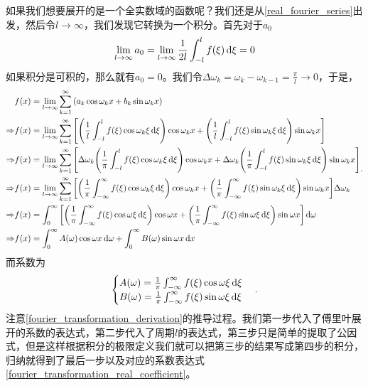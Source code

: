 \documentclass[12pt,a4paper,openany,twoside]{book}
\numberwithin{equation}{section}
\begin{document}
        如果我们想要展开的是一个全实数域的函数呢？我们还是从\ref{real_fourier_series}出发，然后令$l\to\infty$，我们发现它转换为一个积分。首先对于$a_0$
        \begin{equation}
          \lim_{l\to\infty}{a_0}=\lim_{l\to\infty}{\frac{1}{2l}\int_{-l}^{l}{f\qty(\xi)\dd{\xi}}}=0
        \end{equation}
        如果积分是可积的，那么就有$a_0=0$。我们令$\Delta\omega_k=\omega_k-\omega_{k-1}=\frac{\pi}{l}\to0$，于是，
        \begin{equation}
          \label{fourier_transformation_derivation}
          \begin{aligned}
            &f\qty(x)=\lim_{l\to\infty}\sum_{k=1}^{\infty}{\qty(a_k\cos{\omega_k x}+b_k\sin{\omega_k x})}\\
            \Rightarrow&f\qty(x)=\lim_{l\to\infty}{\sum_{k=1}^{\infty}{\qty[\qty(\frac{1}{l}\int_{-l}^l{f\qty(\xi)\cos{\omega_k\xi}\dd{\xi}})\cos{\omega_k x}+\qty(\frac{1}{l}\int_{-l}^l{f\qty(\xi)\sin{\omega_k\xi}\dd{\xi}})\sin{\omega_k x}]}}\\
            \Rightarrow&f\qty(x)=\lim_{l\to\infty}{\sum_{k=1}^{\infty}{\qty[\Delta\omega_k\qty(\frac{1}{\pi}\int_{-l}^l{f\qty(\xi)\cos{\omega_k\xi}\dd{\xi}})\cos{\omega_k x}+\Delta\omega_k\qty(\frac{1}{\pi}\int_{-l}^l{f\qty(\xi)\sin{\omega_k\xi}\dd{\xi}})\sin{\omega_k x}]}}\\
            \Rightarrow&f\qty(x)=\lim_{l\to\infty}{\sum_{k=1}^{\infty}{\qty[\qty(\frac{1}{\pi}\int_{-\infty}^\infty{f\qty(\xi)\cos{\omega_k\xi}\dd{\xi}})\cos{\omega_k x}+\qty(\frac{1}{\pi}\int_{-\infty}^\infty{f\qty(\xi)\sin{\omega_k\xi}\dd{\xi}})\sin{\omega_k x}]\Delta\omega_k}}\\
            \Rightarrow&f\qty(x)=\int_0^\infty{\qty[\qty(\frac{1}{\pi}\int_{-\infty}^\infty{f\qty(\xi)\cos{\omega\xi}\dd{\xi}})\cos{\omega x}+\qty(\frac{1}{\pi}\int_{-\infty}^\infty{f\qty(\xi)\sin{\omega\xi}\dd{\xi}})\sin{\omega x}]\dd{\omega}}\\
            \Rightarrow&f\qty(x)=\int_0^\infty{A\qty(\omega)\cos{\omega x}\dd{\omega}}+\int_0^\infty{B\qty(\omega)\sin{\omega x}\dd{x}}
          \end{aligned}  
          .
        \end{equation}
        而系数为
        \begin{equation}
          \begin{cases}
            \label{fourier_transformation_real_coefficient}
            A\qty(\omega)=\frac{1}{\pi}\int^\infty_{-\infty}{f\qty(\xi)\cos{\omega\xi}\dd{\xi}}\\
            B\qty(\omega)=\frac{1}{\pi}\int^\infty_{-\infty}{f\qty(\xi)\sin{\omega\xi}\dd{\xi}} 
          \end{cases}
          .
        \end{equation}
        注意\ref{fourier_transformation_derivation}的推导过程。我们第一步代入了傅里叶展开的系数的表达式，第二步代入了周期$l$的表达式，第三步只是简单的提取了公因式，但是这样根据积分的极限定义我们就可以把第三步的结果写成第四步的积分，归纳就得到了最后一步以及对应的系数表达式\ref{fourier_transformation_real_coefficient}。
\end{document}
